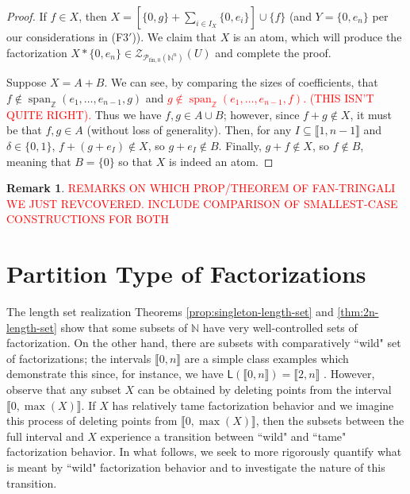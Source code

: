 \documentclass{report}
\newcommand{\NN}{\mathbb{N}}
\renewcommand{\P}{\mathcal{P}}
\newcommand{\ZZ}{\mathbb{Z}}
\newcommand{\Z}{\mathcal{Z}}
\newcommand{\llb}{\llbracket}
\newcommand{\rrb}{\rrbracket}
\newcommand{\fin}{\textrm{fin}}
\newcommand{\fon}{{\textrm{fin}, 0}}
\renewcommand{\:}{\text{:}}
\theoremstyle{definition}
\newtheorem{rk}[defn]{Remark}
\begin{document}
\begin{proof}
If $f\in X$, then $X = \left[\{0,g\}+\sum_{i\in I_X} \{0,e_i\} \right]\cup\{f\}$ (and $Y = \{0,e_n\}$ per our considerations in (F3$'$)).
We claim that $X$ is an atom, which will produce the factorization $X*\{0,e_n\}\in \Z_{\P_\fon(\NN^n)}(U)$ and complete the proof.

Suppose $X = A + B$.
We can see, by comparing the sizes of coefficients, that $f \notin \operatorname{span}_\ZZ(e_1,\dots, e_{n-1},g)$ and \textcolor{red}{$g\notin \operatorname{span}_\ZZ(e_1,\dots, e_{n-1},f)$. (THIS ISN'T QUITE RIGHT).}
Thus we have $f,g\in A\cup B$; however, since $f+g\notin X$, it must be that $f,g\in A$ (without loss of generality).
Then, for any $I\subseteq \llb 1,n-1\rrb$ and $\delta\in \{0,1\}$, $f + (g+ e_I) \notin X$, so $g+e_I\notin B$.
Finally, $g + f \notin X$, so $f\notin B$, meaning that $B = \{0\}$ so that $X$ is indeed an atom.
\end{proof}


\begin{rk}
	\textcolor{red}{REMARKS ON WHICH PROP/THEOREM OF FAN-TRINGALI WE JUST REVCOVERED.
		INCLUDE COMPARISON OF SMALLEST-CASE CONSTRUCTIONS FOR BOTH}
\end{rk}



\section{Partition Type of Factorizations} \label{sec:partitions}



The length set realization Theorems \ref{prop:singleton-length-set} and \ref{thm:2n-length-set} show that some subsets of $\NN$ have very well-controlled sets of factorization.
On the other hand, there are subsets with comparatively ``wild" set of factorizations; the intervals $\llb 0,n \rrb$ are a simple class examples which demonstrate this since, for instance, we have $\mathsf{L}(\llb0,n\rrb) = \llb 2,n \rrb$ \cite[Proposition 4.8]{fan-tringali18}.
However, observe that any subset $X$ can be obtained by deleting points from the interval $\llb 0,\max(X) \rrb$.
If $X$ has relatively tame factorization behavior and we imagine this process of deleting points from $\llb 0,\max(X)\rrb$, then the subsets between the full interval and $X$ experience a transition between ``wild" and ``tame" factorization behavior.
In what follows, we seek to more rigorously quantify what is meant by ``wild" factorization behavior and to investigate the nature of this transition.
\end{document}
